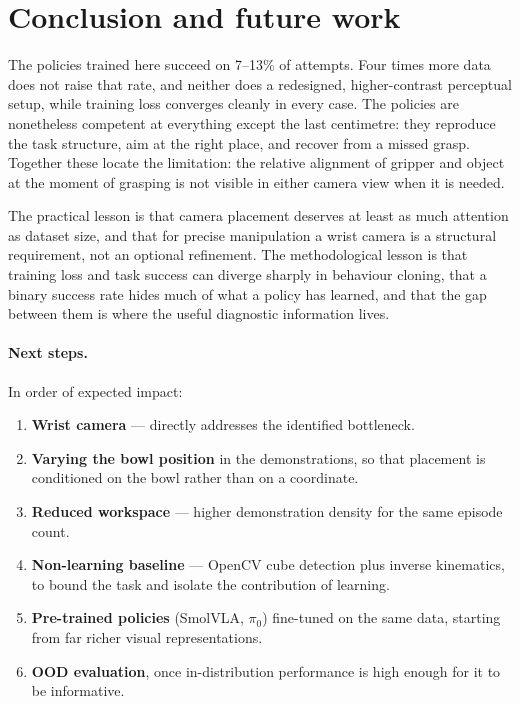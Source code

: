 \documentclass[11pt,a4paper]{article}
\begin{document}
\section{Conclusion and future work}

The policies trained here succeed on 7--13\% of attempts. Four times more data
does not raise that rate, and neither does a redesigned, higher-contrast
perceptual setup, while training loss converges cleanly in every case. The
policies are nonetheless competent at everything except the last centimetre:
they reproduce the task structure, aim at the right place, and recover from a
missed grasp. Together these locate the limitation: the relative alignment of
gripper and object at the moment of grasping is not visible in either camera
view when it is needed.

The practical lesson is that camera placement deserves at least as much
attention as dataset size, and that for precise manipulation a wrist camera is
a structural requirement, not an optional refinement. The methodological lesson
is that training loss and task success can diverge sharply in behaviour
cloning, that a binary success rate hides much of what a policy has learned,
and that the gap between them is where the useful diagnostic information lives.

\paragraph{Next steps.} In order of expected impact:
\begin{enumerate}
  \item \textbf{Wrist camera} --- directly addresses the identified bottleneck.
  \item \textbf{Varying the bowl position} in the demonstrations, so that
        placement is conditioned on the bowl rather than on a coordinate.
  \item \textbf{Reduced workspace} --- higher demonstration density for the same
        episode count.
  \item \textbf{Non-learning baseline} --- OpenCV cube detection plus inverse
        kinematics, to bound the task and isolate the contribution of learning.
  \item \textbf{Pre-trained policies} (SmolVLA, $\pi_0$) fine-tuned on the same
        data, starting from far richer visual representations.
  \item \textbf{OOD evaluation}, once in-distribution performance is high enough
        for it to be informative.
\end{enumerate}
\end{document}
